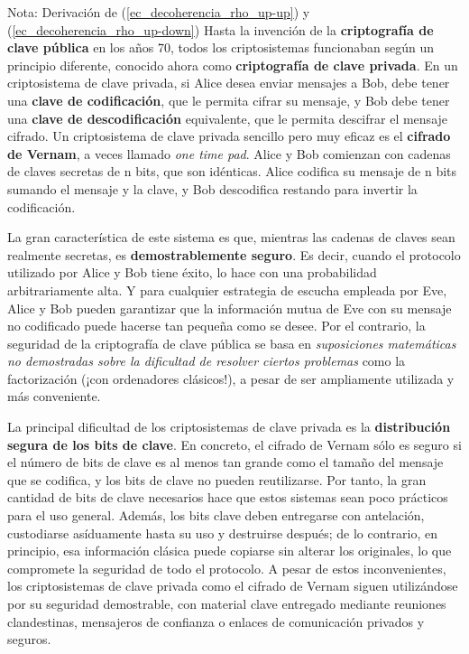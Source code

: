 \documentclass[a4paper,11pt]{book} %
\numberwithin{equation}{chapter}
\begin{document}
\begin{mybox_blue}{Nota: Derivación de (\ref{ec_decoherencia_rho_up-up}) y  (\ref{ec_decoherencia_rho_up-down})}
Hasta la invención de la \textbf{criptografía de clave pública} en los años 70, todos los criptosistemas funcionaban según un principio diferente, conocido ahora como \textbf{criptografía de clave privada}. En un criptosistema de clave privada, si Alice desea enviar mensajes a Bob, debe tener una \textbf{clave de codificación}, que le permita cifrar su mensaje, y Bob debe tener una \textbf{clave de descodificación} equivalente, que le permita descifrar el mensaje cifrado. Un criptosistema de clave privada sencillo pero muy eficaz es el \textbf{cifrado de Vernam}, a veces llamado \textit{one time pad}. Alice y Bob comienzan con cadenas de claves secretas de n bits, que son idénticas. Alice codifica su mensaje de n bits sumando el mensaje y la clave, y Bob descodifica restando para invertir la codificación.

La gran característica de este sistema es que, mientras las cadenas de claves sean realmente secretas, es \textbf{demostrablemente seguro}. Es decir, cuando el protocolo utilizado por Alice y Bob tiene éxito, lo hace con una probabilidad arbitrariamente alta.  Y para cualquier estrategia de escucha empleada por Eve, Alice y Bob pueden garantizar que la información mutua de Eve con su mensaje no codificado puede hacerse tan pequeña como se desee. Por el contrario, la seguridad de la criptografía de clave pública se basa en \textit{suposiciones matemáticas no demostradas sobre la dificultad de resolver ciertos problemas} como la factorización (¡con ordenadores clásicos!), a pesar de ser ampliamente utilizada y más conveniente.

La principal dificultad de los criptosistemas de clave privada es la \textbf{distribución segura de los bits de clave}. En concreto, el cifrado de Vernam sólo es seguro si el número de bits de clave es al menos tan grande como el tamaño del mensaje que se codifica, y los bits de clave no pueden reutilizarse. Por tanto, la gran cantidad de bits de clave necesarios hace que estos sistemas sean poco prácticos para el uso general. Además, los bits clave deben entregarse con antelación, custodiarse asíduamente hasta su uso y destruirse después; de lo contrario, en principio, esa información clásica puede copiarse sin alterar los originales, lo que compromete la seguridad de todo el protocolo. A pesar de estos inconvenientes, los criptosistemas de clave privada como el cifrado de Vernam siguen utilizándose por su seguridad demostrable, con material clave entregado mediante reuniones clandestinas, mensajeros de confianza o enlaces de comunicación privados y seguros.


\end{mybox_blue}
\end{document}
